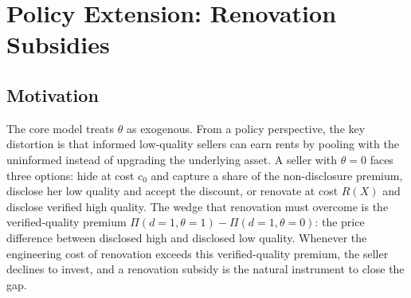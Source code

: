 \documentclass[10pt,letterpaper]{bp-template-concise}
\begin{document}








\section{Policy Extension: Renovation Subsidies}
\label{sec:policy}

\subsection{Motivation}

The core model treats $\theta$ as exogenous. From a policy perspective, the key distortion is that informed low-quality sellers can earn rents by pooling with the uninformed instead of upgrading the underlying asset. A seller with $\theta=0$ faces three options: hide at cost $c_0$ and capture a share of the non-disclosure premium, disclose her low quality and accept the discount, or renovate at cost $R(X)$ and disclose verified high quality. The wedge that renovation must overcome is the verified-quality premium $\Pi(d{=}1,\theta{=}1) - \Pi(d{=}1,\theta{=}0)$: the price difference between disclosed high and disclosed low quality. Whenever the engineering cost of renovation exceeds this verified-quality premium, the seller declines to invest, and a renovation subsidy is the natural instrument to close the gap.
\end{document}

